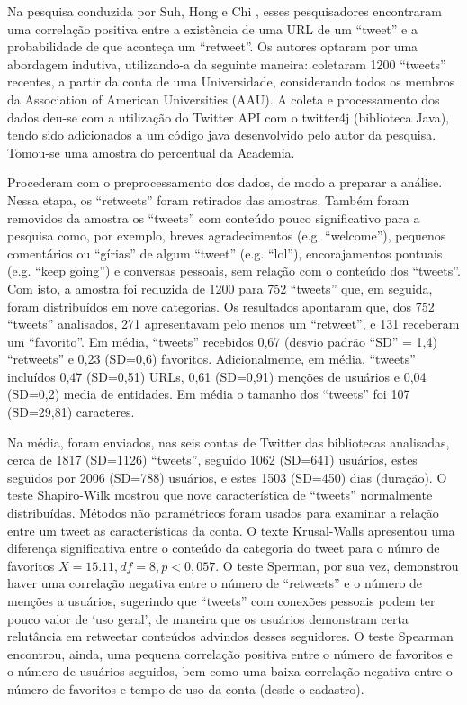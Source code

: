 Na pesquisa conduzida por Suh, Hong e Chi \cite{suh2010want}, esses pesquisadores encontraram uma correlação positiva entre a existência de uma URL de um ``tweet'' e a probabilidade de que aconteça um ``retweet''. Os autores optaram por uma abordagem indutiva, utilizando-a da seguinte maneira: coletaram 1200 ``tweets'' recentes, a partir da conta de uma Universidade, considerando todos os membros da Association of American Universities (AAU). A coleta e processamento dos dados deu-se com a utilização do Twitter API com o twitter4j (biblioteca Java), tendo sido adicionados a um código java desenvolvido pelo autor da pesquisa. Tomou-se uma amostra do percentual da Academia. 

Procederam com o preprocessamento dos dados, de modo a preparar a análise. Nessa etapa, os ``retweets'' foram retirados das amostras. Também foram removidos da amostra os ``tweets'' com conteúdo pouco significativo para a pesquisa como, por exemplo, breves agradecimentos (e.g. “welcome”), pequenos comentários ou “gírias” de algum ``tweet'' (e.g. “lol”), encorajamentos pontuais (e.g. “keep going”) e conversas pessoais, sem relação com o conteúdo dos ``tweets''. Com isto, a amostra foi reduzida de 1200 para 752 ``tweets'' que, em seguida, foram distribuídos em nove categorias. Os resultados apontaram que, dos 752 ``tweets'' analisados, 271 apresentavam pelo menos um ``retweet'', e 131 receberam um “favorito”.  Em média, ``tweets'' recebidos 0,67 (desvio padrão “SD” = 1,4) ``retweets'' e 0,23 (SD=0,6) favoritos. Adicionalmente, em média, ``tweets'' incluídos 0,47 (SD=0,51) URLs, 0,61 (SD=0,91) menções de usuários e 0,04 (SD=0,2) media de entidades. Em média o tamanho dos ``tweets'' foi 107 (SD=29,81) caracteres. 

Na média, foram enviados, nas seis contas de Twitter das bibliotecas analisadas, cerca de 1817 (SD=1126) ``tweets'', seguido 1062 (SD=641) usuários, estes seguidos por 2006 (SD=788) usuários, e estes 1503 (SD=450) dias (duração). O teste Shapiro-Wilk mostrou que nove característica de ``tweets'' normalmente distribuídas. Métodos não paramétricos foram usados para examinar a relação entre um tweet as características da conta. 
O texte Krusal-Walls apresentou uma diferença significativa entre o conteúdo da categoria do tweet para o númro de favoritos $X=15.11, df=8, p<0,057$. O teste Sperman, por sua vez, demonstrou haver uma correlação negativa entre o número de ``retweets'' e o número de menções a usuários, sugerindo que ``tweets'' com conexões pessoais podem ter pouco valor de ‘uso geral’, de maneira que os usuários demonstram certa relutância em retweetar conteúdos advindos desses seguidores. O teste Spearman encontrou, ainda, uma pequena correlação positiva entre o número de favoritos e o número de usuários seguidos, bem como uma baixa correlação negativa entre o número de favoritos e tempo de uso da conta (desde o cadastro). 

